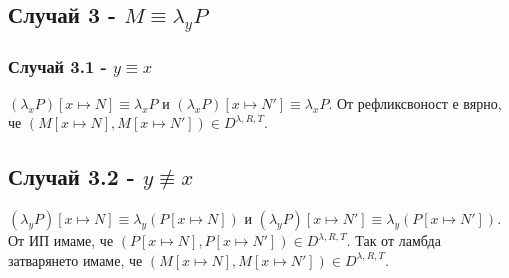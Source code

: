 \documentclass[12pt]{article}
\begin{document}
\subsection*{Случай 3 - $M \equiv \lambda_y P$}
\subsubsection*{Случай 3.1 - $y \equiv x$}
$(\lambda_x P)[x \longmapsto N] \equiv \lambda_x P$ и $(\lambda_x P)[x \longmapsto N'] \equiv \lambda_x P$. От рефликсвоност е вярно, че $(M[x \longmapsto N], M[x \longmapsto N']) \in D^{\lambda, R, T}$.
\subsection*{Случай 3.2 - $y \not\equiv x$}
$(\lambda_y P)[x \longmapsto N] \equiv \lambda_y (P [x \longmapsto N])$ и $(\lambda_y P)[x \longmapsto N'] \equiv \lambda_y (P [x \longmapsto N'])$. От ИП имаме, че $(P [x \longmapsto N], P [x \longmapsto N']) \in D^{\lambda, R, T}$. Так от ламбда затварянето имаме, че $(M[x \longmapsto N], M[x \longmapsto N']) \in D^{\lambda, R, T}$.
\end{document}
